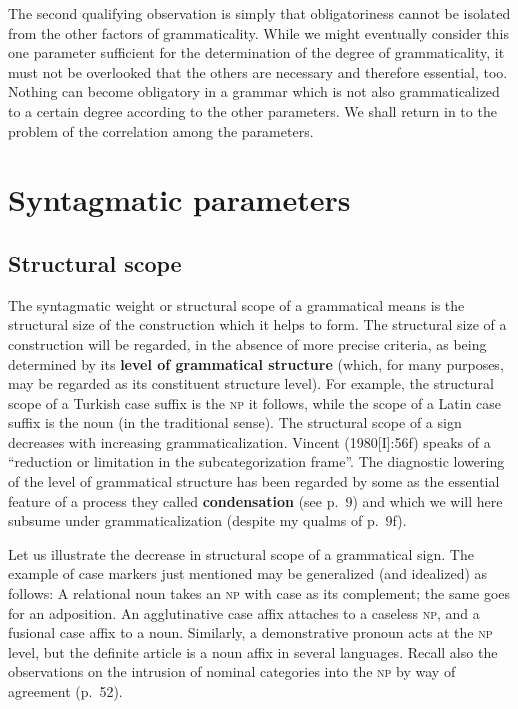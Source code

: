 The second qualifying observation is simply that obligatoriness cannot be isolated from the other factors of grammaticality. While we might eventually consider this one parameter sufficient for the determination of the degree of grammaticality, it must not be overlooked that the others are necessary and therefore essential, too. Nothing can become obligatory in a grammar which is not also grammaticalized to a certain degree according to the other parameters. We shall return in  to the problem of the correlation among the parameters.

\section{Syntagmatic parameters} \label{sec:4.3}
\subsection{Structural scope} \label{sec:4.3.1}

The syntagmatic weight or structural scope of a grammatical means is the structural size of the construction which it helps to form. The structural size of a construction will be regarded, in the absence of more precise criteria, as being determined by its \textbf{level of grammatical structure} (which, for many purposes, may be regarded as its constituent structure level). For example, the structural scope of a Turkish case suffix is the \textsc{np} it follows, while the scope of a Latin case suffix is the noun (in the traditional sense). The structural scope of a sign decreases with increasing grammaticalization. Vincent (1980[I]:56f) speaks of a “reduction or limitation in the subcategorization frame”. The diagnostic lowering of the level of grammatical structure has been regarded by some as the essential feature of a process they called \textbf{condensation} (see p.~9) and which we will here subsume under grammaticalization (despite my qualms of p.~9f).

Let us illustrate the decrease in structural scope of a grammatical sign. The example of case markers just mentioned may be generalized (and idealized) as follows: A relational noun takes an \textsc{np} with case as its complement; the same goes for an adposition. An agglutinative case affix attaches to a caseless \textsc{np}, and a fusional case affix to a noun. Similarly, a demonstrative pronoun acts at the \textsc{np} level, but the definite article is a noun affix in several languages. Recall also the observations on the intrusion of nominal categories into the \textsc{np} by way of agreement (p.~52).

